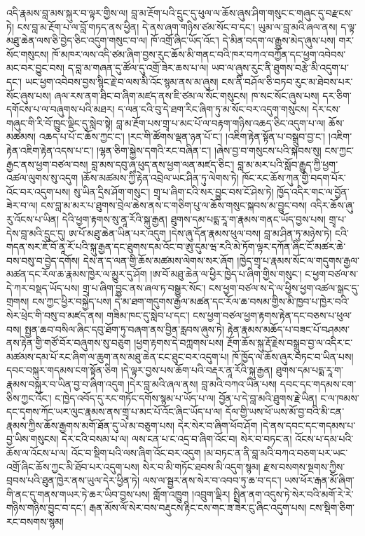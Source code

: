 \documentclass{article}
\begin{document}
འདི་རྣམས་བླ་མས་སྐུར་བ་ལྟར་གྱིས་ལ། བླ་མ་རྔོག་པའི་དྲུང་དུ་ཕུལ་ལ་ཆོས་ཞུས་ཤིག་གསུང་ང་གཞུང་དུ་བརྫངས་ཏེ། ངས་བླ་མ་རྔོག་པ་ལ་བློ་གཏད་ནས་ཕྱིན། དེ་ནས་ཞག་གཉིས་ཙམ་སོང་བ་དང་། ཡུམ་ལ་བླ་མའི་ཞལ་ནས། ད་ལྟ་མཐུ་ཆེན་ལས་ཅི་བྱེད་ཅིང་འདུག་གསུང་བ་ལ། ཁོ་འགྲོ་ཞིང་ཡོད་འོང་། དེ་མིན་བདག་ལ་རྒྱུས་མེད་ཞུས་པས། གར་སོང་གསུངས། ཁོ་མཁར་ལས་འདི་ཙམ་ཞིག་བྱས་རུང་ཆོས་མི་གནང་བའི་ཁར་བཀའ་བཀྱོན་དང་ཕྱག་འབེབས་མང་བར་བྱུང་བས། ད་བླ་མ་གཞན་དུ་ཚོལ་དུ་འགྲོ་ཟེར་ཆས་པ་ལ། ཡབ་ལ་ཞུས་རུང་ནི་ཐུགས་བརྩེ་མི་འདུག་པ་དང་། ཡང་ཕྱག་འབེབས་བྱས་སྙིང་རྗེ་བ་ལས་མི་འོང་སྙམ་ནས་མ་ཞུས། ངས་ནི་བཤོལ་ཅི་བཏབ་རུང་མ་ཐེབས་པར་སོང་ཞུས་པས། ཞལ་རས་ནག་ཐིང་བ་ཞིག་མཛད་ནས་ཇི་ཙམ་ལ་སོང་གསུངས། ཁ་སང་སོང་ཞུས་པས། དར་ཅིག་དགོངས་པ་ལ་བཞུགས་པའི་མཐར། ད་ལན་ངའི་བུ་དེ་ཐག་རིང་ཞིག་ཏུ་མ་སོང་བར་འདུག་གསུངས། དེར་ངས་གཞུང་གི་རི་བོ་ཁྱུང་ལྡིང་དུ་སླེབ་སྟེ། བླ་མ་རྔོག་པས་གྲྭ་པ་མང་པོ་ལ་བརྟག་གཉིས་འཆད་ཅིང་འདུག་པ་ལ། ཆོས་མཚམས། འཆད་པ་པོ་ང་ཆོས་ཀྱང་ང་། །རང་གི་ཚོགས་ལྡན་ཉན་པོ་ང་། །འཇིག་རྟེན་སྟོན་པ་བསྒྲུབ་བྱ་ང་། །འཇིག་རྟེན་འཇིག་རྟེན་འདས་པ་ང་། །ལྷན་ཅིག་སྐྱེས་དགའི་རང་བཞིན་ང་། །ཞེས་བྱ་བ་གསུངས་པའི་སྐབས་སུ། ངས་ཀྱང་རྒྱང་ནས་ཕྱག་བཙལ་བས། བླ་མས་དབུ་ཞྭ་ཕུད་ནས་ཕྱག་ལན་མཛད་ཅིང་། བླ་མ་མར་པའི་སློབ་རྒྱུད་ཀྱི་ཕྱག་འཚལ་ལུགས་སུ་འདུག །ཆོས་མཚམས་ཀྱི་རྟེན་འབྲེལ་ཡང་ཤིན་ཏུ་ལེགས་ཏེ། ཁོང་རང་ཆོས་ཀུན་གྱི་བདག་པོར་འོང་བར་འདུག་པས། སུ་ཡིན་དྲིས་ཤོག་གསུང་། གྲྭ་པ་ཞིག་ངའི་སར་བྱུང་བས་ངོ་ཤེས་ཏེ། ཁྱོད་འདིར་གང་ལ་བྱོན་ཟེར་བ་ལ། ངས་བླ་མ་མར་པ་ཐུགས་བྲེལ་ཆེས་ནས་ང་གཅིག་པུ་ལ་ཆོས་གསུང་སྐབས་མ་བྱུང་བས། འདིར་ཆོས་ཞུ་རུ་འོངས་པ་ཡིན། དེའི་ཕྱག་རྟགས་སུ་ནཱ་རོའི་སྐུ་རྒྱན། ཐུགས་དམ་པདྨ་རཱ་ག་རྣམས་གནང་ཡོད་བྱས་པས། གྲྭ་པ་དེས་བླ་མའི་དྲུང་དུ། ཨ་པོ་མཐུ་ཆེན་ཡིན་པར་འདུག །དེས་ཞུ་དོན་རྣམས་ཕུལ་བས། བླ་མ་ཤིན་ཏུ་མཉེས་ཏེ། ངའི་གདན་སར་ཇོ་བོ་ནཱ་རོ་པའི་སྐུ་རྒྱན་དང་ཐུགས་དམ་འོང་བ་ཨུ་དུམ་ཝ་རའི་མེ་ཏོག་ལྟར་དཀོན་ཞིང་ངོ་མཚར་ཆེ་བས་བསུ་བ་བྱེད་དགོས། དེས་ན་ད་ལན་གྱི་ཆོས་མཚམས་ལེགས་སར་ཞོག །ཁྱེད་གྲྭ་པ་རྣམས་སོང་ལ་གདུགས་རྒྱལ་མཚན་དང་རོལ་ཆ་རྣམས་ཁྱེར་ལ་མྱུར་དུ་ཤོག །ཨ་བོ་མཐུ་ཆེན་ལ་ཕྱིར་ཁྱེད་པ་ཞིག་གྱིས་གསུང་། ང་ཕྱག་བཙལ་ས་དེ་ཀར་བསྡད་ཡོད་པས། གྲྭ་པ་ཞིག་བྱུང་ནས་ཞལ་ཏ་བསྒྱུར་སོང་། ངས་ཕྱག་བཙལ་ས་དེ་ལ་ཕྱིས་ཕྱག་འཚལ་སྒང་དུ་གྲགས། ངས་ཀྱང་ཕྱིར་བསྐྱེད་པས། དེ་མ་ཐག་གདུགས་རྒྱལ་མཚན་དང་རོལ་ཆ་བསམ་གྱིས་མི་ཁྱབ་པ་ཁྱེར་བའི་སེར་ཕྲེང་གི་བསུ་བ་མཛད་ནས། གཟིམ་ཁང་དུ་སླེབ་པ་དང་། ངས་ཕྱག་བཙལ་ཕྱག་རྟགས་རྟེན་དང་བཅས་པ་ཕུལ་བས། སྤྱན་ཆབ་བསིལ་ཞིང་དབུ་ཐོག་ཏུ་བཞག་ནས་བྱིན་རླབས་ཞུས་ཏེ། རྟེན་རྣམས་མཆོད་པ་བཟང་པོ་བཤམས་ནས་རྟེན་གྱི་གཙོ་བོར་བཞུགས་སུ་བཅུག །ཕྱག་རྟགས་དེ་བཀླགས་པས། རྔོག་ཆོས་སྐུ་རྡོ་རྗེས་བསྒྲུབ་བྱ་ལ་འདིར་ང་མཚམས་དམ་པོ་རང་ཞིག་ལ་ཆུག་ནས་མཐུ་ཆེན་ངང་ཐུང་བར་འདུག་པ། ཁོ་ཁྱོད་ལ་ཆོས་ཞུར་བཏང་བ་ཡིན་པས། དབང་བསྐུར་གདམས་ངག་སྟོན་ཅིག །དེ་ལྟར་བྱས་པས་ཆོག་པའི་བརྡར་ནཱ་རོའི་སྐུ་རྒྱན། ཐུགས་དམ་པདྨ་རཱ་ག་རྣམས་བསྐུར་བ་ཡིན་བྱ་བ་ཞིག་འདུག །དེར་བླ་མའི་ཞལ་ནས། བླ་མའི་བཀའ་ཡིན་པས། དབང་དང་གདམས་ངག་ཅིས་ཀྱང་འོང་། ང་ཁྱེད་འབོད་དུ་རང་གཏོང་དགོས་སྙམ་པ་ཡོད་པ་ལ། བྱོན་པ་དེ་བླ་མའི་ཐུགས་རྗེ་ཡིན། ང་ལ་ཁམས་དང་དྭགས་ཀོང་ཡར་ལུང་རྣམས་ནས་གྲྭ་པ་མང་པོ་འོང་ཞིང་ཡོད་པ་ལ། དོལ་གྱི་ཡས་ཕོ་ཡས་མོ་བྱ་བའི་མི་ངན་རྣམས་ཀྱིས་ཆོས་རྒྱགས་མགོ་ཐོན་དུ་ཡེ་མ་བཅུག་པས། དེར་སེར་བ་ཞིག་ཕོབ་ཤོག །དེ་ནས་དབང་དང་གདམས་པ་བྱ་ཡིས་གསུངས། དེར་ངའི་བསམ་པ་ལ། ལས་ངན་པ་ང་འདྲ་བ་ཞིག་འོང་བ། སེར་བ་བཏང་ན། འོངས་པ་དམ་པའི་ཆོས་ལ་འོངས་པ་ལ། འོང་བ་སྡིག་པའི་ལས་ཞིག་འོང་བར་འདུག །མ་བཏང་ན་ནི་བླ་མའི་བཀའ་བཅག་པར་ཡང་འགྲོ་ཞིང་ཆོས་ཀྱང་མི་ཐོབ་པར་འདུག་པས། སེར་བ་མི་གཏོང་ཐབས་མི་འདུག་སྙམ། རྫས་བསགས་སྔགས་ཀྱིས་བྲབས་པའི་ཐུན་ཁྱེར་ནས་ཡུལ་དེར་ཕྱིན་ཏེ། ལས་ལ་སྦྱར་ནས་སེར་བ་འབབ་ཏུ་ཆ་བ་དང་། ཡས་ཕོར་རྒན་མོ་ཞིག་གི་ནང་དུ་གནས་གཡར་ཏེ་ཆར་ཡིབ་བྱས་པས། གློག་འཁྱུག །འབྲུག་ལྡིར། སྤྲིན་ནག་འདུས་ཏེ་སེར་བའི་མགོ་རེ་རེ་གཉིས་གཉིས་བྱུང་བ་དང་། རྒན་མོས་ལོ་སེར་བས་བརྡུངས་རྟིང་ངས་གང་ཟ་ཟེར་ངུ་ཞིང་འདུག་པས། ངས་སྡིག་ཅིག་རང་བསགས་སྙམ། 
\end{document}
